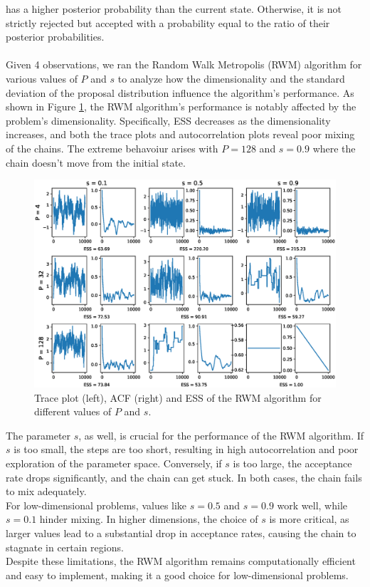 \documentclass{article}
\begin{document}
has a higher posterior probability than the current state. Otherwise, it is not strictly rejected but 
accepted with a probability equal to the ratio of their posterior probabilities.\\\\
Given 4 observations, we ran the Random Walk Metropolis (RWM) algorithm for various values of \(P\) and \(s\) to analyze how the dimensionality and 
the standard deviation of the proposal distribution influence the algorithm's performance. As shown in Figure \ref{fig:RWM}, 
the RWM algorithm's performance is notably affected by the problem's dimensionality. Specifically, ESS
decreases as the dimensionality increases, and both the trace plots and autocorrelation plots reveal poor mixing of the chains. 
The extreme behavoiur arises with \(P=128\) and $s=0.9$ where the chain doesn't move from the initial state.
\begin{figure}[H]
    \centering
    \includegraphics[width=\textwidth]{plots/RWM.eps}
    \caption{Trace plot (left), ACF (right) and ESS of the RWM algorithm for different values of \(P\) and \(s\).}
    \label{fig:RWM}
\end{figure}
The parameter \(s\), as well, is crucial for the performance of the RWM algorithm. If \(s\) is too small, the steps are too 
short, resulting in high autocorrelation and poor exploration of the parameter space. Conversely, if \(s\) is too 
large, the acceptance rate drops significantly, and the chain can get stuck. In both cases, the chain fails to mix 
adequately.\\
For low-dimensional problems, values like \(s = 0.5\) and \(s = 0.9\) work well, while $s=0.1$ hinder 
mixing. In higher dimensions, the choice of \(s\) is more critical, as larger values lead to a substantial drop 
in acceptance rates, causing the chain to stagnate in certain regions.\\
Despite these limitations, the RWM algorithm remains computationally efficient and easy to implement, making 
it a good choice for low-dimensional problems.
\\\\
\end{document}
